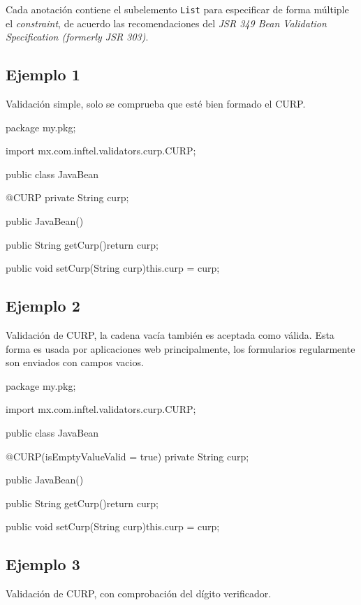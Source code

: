 \documentclass[12pt,letterpaper]{article}
\begin{document}
Cada anotación contiene el subelemento \texttt{List} para especificar de forma múltiple el \emph{constraint}, de
acuerdo las recomendaciones del \emph{JSR 349 Bean Validation Specification (formerly JSR 303)}.

\subsection{Ejemplo 1}

Validación simple, solo se comprueba que esté bien formado el CURP.

\begin{listing}{1}
package my.pkg;

import mx.com.inftel.validators.curp.CURP;

public class JavaBean{

    @CURP
    private String curp;

    public JavaBean(){}

    public String getCurp(){return curp;}

    public void setCurp(String curp){this.curp = curp;}
}
\end{listing}

\subsection{Ejemplo 2}

Validación de CURP, la cadena vacía también es aceptada como válida. Esta forma es usada por aplicaciones
web principalmente, los formularios regularmente son enviados con campos vacios.

\begin{listing}{1}
package my.pkg;

import mx.com.inftel.validators.curp.CURP;

public class JavaBean{

    @CURP(isEmptyValueValid = true)
    private String curp;

    public JavaBean(){}

    public String getCurp(){return curp;}

    public void setCurp(String curp){this.curp = curp;}
}
\end{listing}

\subsection{Ejemplo 3}

Validación de CURP, con comprobación del dígito verificador.
\end{document}
